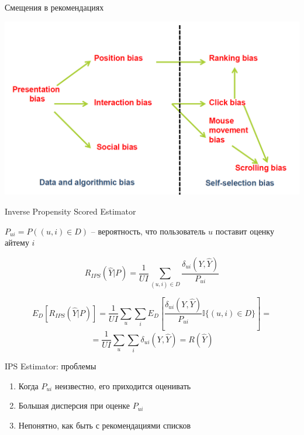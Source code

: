 \documentclass[11pt,aspectratio=169,handout]{beamer}
\begin{document}
\begin{frame}{Смещения в рекомендациях \cite{BIAS}}

\begin{center}
\includegraphics[scale=0.2]{images/bias.png}
\end{center}

\end{frame}

\begin{frame}{Inverse Propensity Scored Estimator \cite{TREATMENTS}}

$P_{ui} = P((u, i) \in D)$ -- вероятность, что пользователь $u$ поставит оценку айтему $i$

\[
R_{IPS}(\hat Y | P) = \frac{1}{U I} \sum_{(u,i) \in D} \frac{\delta_{ui}(Y, \hat Y)}{P_{ui}}
\]

\[
E_D [R_{IPS}(\hat Y | P)] = \frac{1}{U I} \sum_u \sum_i E_D\left[ \frac{\delta_{ui}(Y, \hat Y)}{P_{ui}} \mathbb{I}\{(u, i) \in D\}\right] = 
\]
\[
= \frac{1}{U I} \sum_u \sum_i \delta_{ui} (Y, \hat Y) = R(\hat Y) 
\]

\end{frame}

\begin{frame}{IPS Estimator: проблемы}

\begin{enumerate}
\item Когда $P_{ui}$ неизвестно, его приходится оценивать
\item Большая дисперсия при оценке $P_{ui}$
\item Непонятно, как быть с рекомендациями списков
\end{enumerate}

\end{frame}
\end{document}
